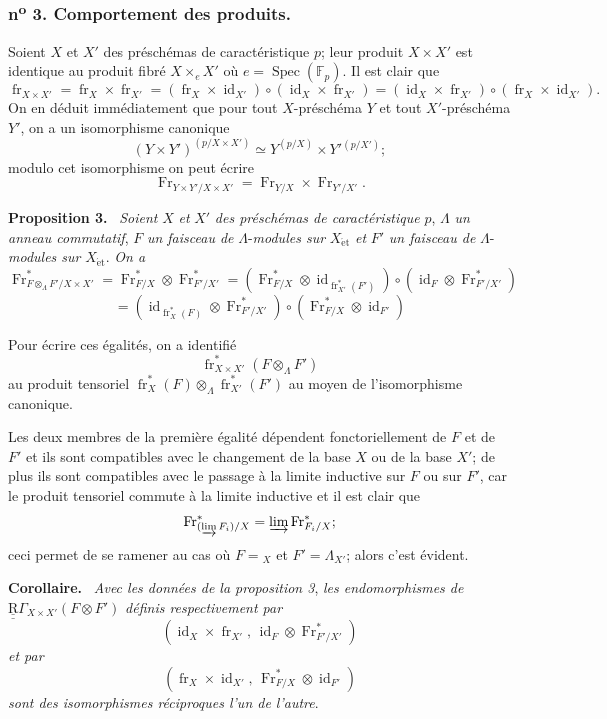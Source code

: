 \documentclass[11pt]{article}
\newenvironment{statement}[1]{\par\medskip\noindent\textbf{#1.}\ }{\par\medskip}
\DeclareMathOperator{\Spec}{Spec}
\providecommand{\et}{\mathrm{\acute{e}t}}
\providecommand{\id}{\operatorname{id}}
\providecommand{\id}{\operatorname{id}}
\providecommand{\id}{\operatorname{id}}
\providecommand{\id}{\operatorname{id}}
\providecommand{\Spec}{\operatorname{Spec}}
\providecommand{\Spec}{\operatorname{Spec}}
\providecommand{\id}{\operatorname{id}}
\providecommand{\Spec}{\operatorname{Spec}}
\providecommand{\fr}{\operatorname{fr}}
\providecommand{\Fr}{\operatorname{Fr}}
\providecommand{\Fr}{\operatorname{Fr}}
\providecommand{\fr}{\operatorname{fr}}
\providecommand{\Spec}{\operatorname{Spec}}
\providecommand{\id}{\operatorname{id}}
\providecommand{\et}{\acute{e}t}
\begin{document}
\subsubsection*{n\textsuperscript{o} 3. Comportement des produits.}

Soient $X$ et $X'$ des préschémas de caractéristique $p$; leur produit $X\times X'$ est identique au produit fibré $X\times_eX'$ où $e=\Spec(\mathbb F_p)$. Il est clair que
\[
\fr_{X\times X'}=\fr_X\times\fr_{X'}=(\fr_X\times\id_{X'})\circ(\id_X\times\fr_{X'})
=(\id_X\times\fr_{X'})\circ(\fr_X\times\id_{X'}).
\]
On en déduit immédiatement que pour tout $X$-préschéma $Y$ et tout $X'$-préschéma $Y'$, on a un isomorphisme canonique
\[
(Y\times Y')^{(p/X\times X')}\simeq Y^{(p/X)}\times Y'{}^{(p/X')};
\]
modulo cet isomorphisme on
peut écrire
\[
\Fr_{Y\times Y'/X\times X'}=\Fr_{Y/X}\times\Fr_{Y'/X'}.
\]

\begin{statement}{Proposition 3}
\emph{Soient} $X$ \emph{et} $X'$ \emph{des préschémas de caractéristique} $p$, $\Lambda$ \emph{un anneau commutatif}, $F$ \emph{un faisceau de} $\Lambda$-\emph{modules sur} $X_{\et}$ \emph{et} $F'$ \emph{un faisceau de} $\Lambda$-\emph{modules sur} $X_{\et}$. \emph{On a}
\[
\Fr^*_{F\otimes_\Lambda F'/X\times X'}
=\Fr^*_{F/X}\otimes\Fr^*_{F'/X'}
=(\Fr^*_{F/X}\otimes\id_{\fr_{X'}^*(F')})\circ
(\id_F\otimes\Fr^*_{F'/X'})
\]
\[
=(\id_{\fr_X^*(F)}\otimes\Fr^*_{F'/X'})\circ
(\Fr^*_{F/X}\otimes\id_{F'})
\]
\end{statement}

Pour écrire ces égalités, on a identifié
\[
\fr_{X\times X'}^*(F\otimes_\Lambda F')
\]
au produit tensoriel $\fr_X^*(F)\otimes_\Lambda\fr_{X'}^*(F')$ au moyen de l'isomorphisme canonique.

Les deux membres de la première égalité dépendent fonctoriellement de $F$ et de $F'$ et ils sont compatibles avec le changement de la base $X$ ou de la base $X'$; de plus ils sont compatibles avec le passage à la limite inductive sur $F$ ou sur $F'$, car le produit tensoriel commute à la limite inductive et il est clair que
\[
\Fr^*_{(\varinjlim F_i)/X}=\varinjlim\Fr^*_{F_i/X};
\]
ceci permet de se ramener au cas où $F={}_X$ et $F'=\Lambda_{X'}$; alors c'est évident.

\begin{statement}{Corollaire}
\emph{Avec les données de la proposition 3}, \emph{les endomorphismes de} $\underline{\underline{\mathrm{R}}}\Gamma_{X\times X'}(F\otimes F')$ \emph{définis respectivement par}
\[
(\id_X\times\fr_{X'},\,\id_F\otimes\Fr^*_{F'/X'})
\]
\emph{et par}
\[
(\fr_X\times\id_{X'},\,\Fr^*_{F/X}\otimes\id_{F'})
\]
\emph{sont des isomorphismes réciproques l'un de l'autre}.
\end{statement}
\end{document}
